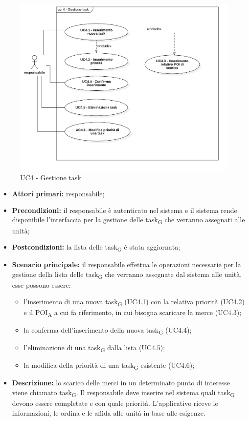 \begin{figure}[H]
	\centering
	\includegraphics[scale=0.52]{res/images/uc4.png}
	\caption{UC4 - Gestione task}
\end{figure}

\begin{itemize}
	\item 	\textbf{Attori primari:} responsabile;
	\item 	\textbf{Precondizioni:} il responsabile è autenticato nel sistema e il sistema rende disponibile l’interfaccia per la gestione delle \gls{task}\textsubscript{G} che verranno assegnati alle unità;
	\item 	\textbf{Postcondizioni:} la lista delle \gls{task}\textsubscript{G} è stata aggiornata;
	\item 	\textbf{Scenario principale:} il responsabile effettua le operazioni necessarie per la gestione della lista delle \gls{task}\textsubscript{G} che verranno assegnate dal sistema alle unità, esse possono essere:
	\begin{itemize}
		\item l’inserimento di una nuova \gls{task}\textsubscript{G} (UC4.1) con la relativa priorità (UC4.2) e il \acrshort{POI}\textsubscript{A} a cui fa riferimento, in cui bisogna scaricare la merce (UC4.3);
		\item la conferma dell’inserimento della nuova \gls{task}\textsubscript{G} (UC4.4);
		\item l’eliminazione di una \gls{task}\textsubscript{G} dalla lista (UC4.5);
		\item la modifica della priorità di una \gls{task}\textsubscript{G} esistente (UC4.6);
	\end{itemize}
	\item 	\textbf{Descrizione:} lo scarico delle merci in un determinato punto di interesse viene chiamato \gls{task}\textsubscript{G}. Il responsabile deve inserire nel sistema quali \gls{task}\textsubscript{G} devono essere completate e con quale priorità. L’applicativo riceve le informazioni, le ordina e le affida alle unità in base alle esigenze. 

\end{itemize}

